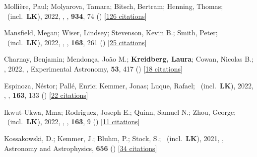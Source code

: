 \item[{\color{numcolor}\scriptsize66}] Molli{\`e}re, Paul; Molyarova, Tamara; Bitsch, Bertram; Henning, Thomas; \etal\ (incl.\ \textbf{LK}), 2022, , \apj, \textbf{934}, 74 () [\href{https://ui.adsabs.harvard.edu/abs/2022ApJ...934...74M}{126 citations}]

\item[{\color{numcolor}\scriptsize65}] Mansfield, Megan; Wiser, Lindsey; Stevenson, Kevin B.; Smith, Peter; \etal\ (incl.\ \textbf{LK}), 2022, , \aj, \textbf{163}, 261 () [\href{https://ui.adsabs.harvard.edu/abs/2022AJ....163..261M}{25 citations}]

\item[{\color{numcolor}\scriptsize64}] Charnay, Benjamin; Mendon{\c{c}}a, Jo{\~a}o M.; \textbf{Kreidberg, Laura}; Cowan, Nicolas B.; \etal, 2022, , Experimental Astronomy, \textbf{53}, 417 () [\href{https://ui.adsabs.harvard.edu/abs/2022ExA....53..417C}{18 citations}]

\item[{\color{numcolor}\scriptsize63}] Espinoza, N{\'e}stor; Pall{\'e}, Enric; Kemmer, Jonas; Luque, Rafael; \etal\ (incl.\ \textbf{LK}), 2022, , \aj, \textbf{163}, 133 () [\href{https://ui.adsabs.harvard.edu/abs/2022AJ....163..133E}{22 citations}]

\item[{\color{numcolor}\scriptsize62}] Ikwut-Ukwa, Mma; Rodriguez, Joseph E.; Quinn, Samuel N.; Zhou, George; \etal\ (incl.\ \textbf{LK}), 2022, , \aj, \textbf{163}, 9 () [\href{https://ui.adsabs.harvard.edu/abs/2022AJ....163....9I}{11 citations}]

\item[{\color{numcolor}\scriptsize61}] Kossakowski, D.; Kemmer, J.; Bluhm, P.; Stock, S.; \etal\ (incl.\ \textbf{LK}), 2021, , Astronomy and Astrophysics, \textbf{656} () [\href{https://ui.adsabs.harvard.edu/abs/2021A&A...656A.124K}{34 citations}]

